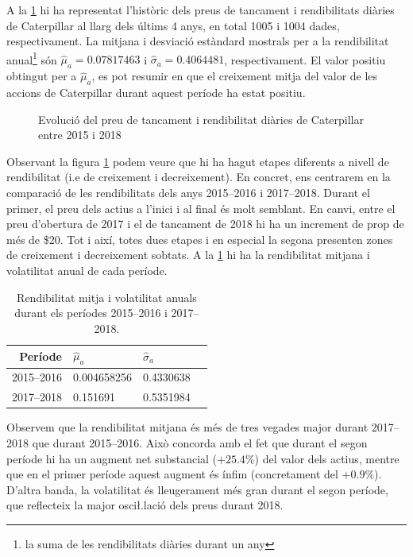 \documentclass{article}
\numberwithin{table}{section}
\numberwithin{figure}{section}
\numberwithin{equation}{section}
\begin{document}
A la \cref{fig:serie preus} hi ha representat l'històric dels preus de tancament i rendibilitats diàries de Caterpillar al llarg dels últims 4 anys, en total 1005 i 1004 dades, respectivament. La mitjana i desviació estàndard mostrals per a la rendibilitat anual\footnote{la suma de les rendibilitats diàries durant un any} són $\hat{\mu}_a=\num{0.07817463}$ i $\hat{\sigma}_a=\num{0.4064481}$, respectivament. El valor positiu obtingut per a $\hat{\mu}_a$, es pot resumir en que el creixement mitja del valor de les accions de Caterpillar durant aquest període ha estat positiu.
\begin{figure}[htb]
	\centering \sffamily \small
	
	\caption{Evolució del preu de tancament i rendibilitat diàries de Caterpillar entre 2015 i 2018}
	\label{fig:serie preus}
\end{figure}

Observant la figura \ref{fig:serie preus} podem veure que hi ha hagut etapes diferents a nivell de rendibilitat (i.e de creixement i decreixement). En concret, ens centrarem en la comparació de les rendibilitats dels anys 2015--2016 i 2017--2018. Durant el primer, el preu dels actius a l'inici i al final és molt semblant. En canvi, entre el preu d'obertura de 2017 i el de tancament de 2018 hi ha un increment de prop de més de \$20. Tot i així, totes dues etapes i en especial la segona presenten zones de creixement i decreixement sobtats. A la \cref{tab:estim} hi ha la rendibilitat mitjana i volatilitat anual de cada període. 
\begin{table}[htb]
	\small \sffamily \centering
	\caption{Rendibilitat mitja i volatilitat anuals durant els períodes 2015--2016 i 2017--2018.}
	\label{tab:estim}
	\begin{tabular}{@{}rlll@{}}
		\toprule 
		Període & \( \hat{\mu}_a \) & \( \hat{\sigma}_a \) \\
		\midrule
		2015--2016 & \num{0.004658256} & \num{0.4330638} \\ 
		2017--2018 & \num{0.151691}   & \num{0.5351984}   \\ 
	\end{tabular}
\end{table}
Observem que la rendibilitat mitjana és més de tres vegades major durant 2017--2018 que durant 2015--2016. Això concorda amb el fet que durant el segon període hi ha un augment net substancial ($+25.4\%$) del valor dels actius, mentre que en el primer període aquest augment és ínfim (concretament del $+0.9\%$). D'altra banda, la volatilitat és lleugerament més gran durant el segon període, que reflecteix la major osci\l.lació dels preus durant 2018. 
\end{document}
